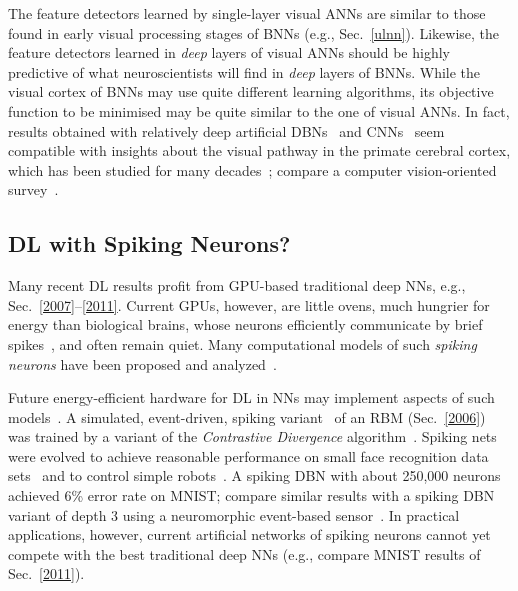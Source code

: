 \documentclass[letterpaper]{article}
\begin{document}
\begin{CJK*}{UTF8}{gbsn}
The feature detectors learned by single-layer visual ANNs 
are similar to those found in early visual processing stages of BNNs
(e.g., Sec.~\ref{ulnn}).
Likewise, the feature detectors learned in {\em deep} layers of visual ANNs should be highly predictive of what neuroscientists will find in {\em deep} layers of BNNs. While the visual cortex of BNNs may use quite different learning algorithms, its objective function to be minimised may be quite similar to the one of visual ANNs. 
In fact, results obtained 
with relatively deep artificial DBNs~\citep{lee2007sparse} and CNNs~\citep{Yamins2013}
seem compatible with insights about
the visual pathway in the primate cerebral cortex,
which has been studied for many decades~\citep[e.g.,][]{hubel1968,perrett1982,desimone1984,felleman1991,perrett1992,Tanaka:94,logothetis1995,Bichot:05,poggio2005,lennie2005,connor2007,kriegeskorte2008,dicarlo2012}; compare a 
computer vision-oriented survey~\citep{kruger2013}.



\subsection{DL with Spiking Neurons?}
\label{spiking}
Many recent DL results profit from GPU-based traditional deep NNs, e.g., Sec.~\ref{2007}--\ref{2011}. Current GPUs, however, are little ovens, much hungrier for energy than biological brains, whose neurons efficiently communicate by brief spikes~\citep{hodgkin1952,fitzhugh1961,nagumo1962}, 
and often remain quiet. Many computational models of such 
{\em spiking neurons} have been proposed and analyzed~\citep[e.g.,][]{gerstner1992,zipser1993,stemmler1996,tsodyks1996,maex1996,maass1996,maass1997,kistler1997,amit1997,tsodyks1998,kempter1999,song2000,stoop2000,brunel2000,bohte2002,gerstnerbook,izhikevich2003,seung2003,deco2005,brette2007,brea2013,nessler2013,kasabov2014,maass2014,rezende2014}.

Future energy-efficient hardware for DL in NNs may implement aspects of such models~\citep[e.g.,][]{liu2001,roggen2003,glackin2005,schemmel2006,fieres2008,khan2008,serrano2009,jin2010,indiveri2011,neil2014,merolla2014}. 
A simulated, event-driven, spiking variant~\citep{nefti2014} of an RBM (Sec.~\ref{2006})
was trained by a variant of the
{\em Contrastive Divergence} algorithm~\citep{hinton:2002}.
Spiking nets were evolved to achieve reasonable performance on small face recognition data sets~\citep{wysoski2010} and to control simple robots~\citep{floreano2001,hagras2004}.
A spiking DBN with about 250,000 neurons~\citep[as part of a larger NN;][]{eliasmith2012,eliasmith2013} 
achieved 6\% error rate on MNIST;
compare similar results with a spiking DBN variant of depth 3 using a neuromorphic event-based sensor~\citep{oconnor2013}. 
In practical applications, however,
current artificial networks of
spiking neurons cannot yet compete with the best traditional deep NNs
(e.g., compare MNIST results of Sec.~\ref{2011}). 


\end{CJK*}
\end{document}
